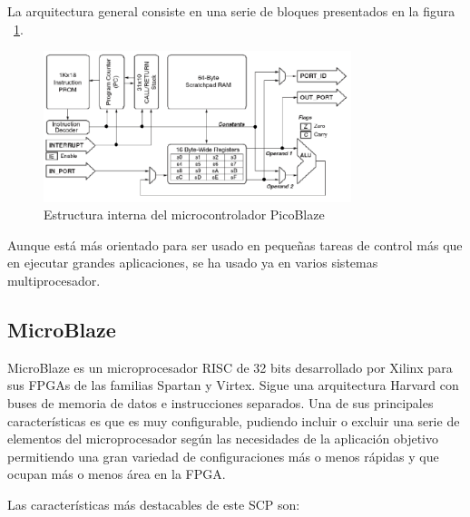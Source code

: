 	La arquitectura general consiste en una serie de bloques presentados en la figura ~\ref{fig:PicoBlazer}.
		
	\begin{figure}[h!]
 	\begin{center}
  	\includegraphics[width=0.8\textwidth,keepaspectratio=true]{./images/estructurapico}
  	\caption{Estructura interna del microcontrolador PicoBlaze}
  	\label{fig:PicoBlazer}
 	\end{center}
	\end{figure}

Aunque está más orientado para ser usado en pequeñas tareas de control más que en ejecutar grandes aplicaciones, se ha usado ya en varios sistemas multiprocesador.

	\subsection{MicroBlaze}

MicroBlaze es un microprocesador RISC de 32 bits desarrollado por Xilinx para sus FPGAs de las familias Spartan y Virtex. Sigue una arquitectura Harvard con buses de memoria de datos e instrucciones separados. Una de sus principales características es que es muy configurable, pudiendo incluir o excluir una serie de elementos del microprocesador según las necesidades de la aplicación objetivo permitiendo una gran variedad de configuraciones más o menos rápidas y que ocupan más o menos área en la FPGA.

Las características más destacables de este SCP son:    

